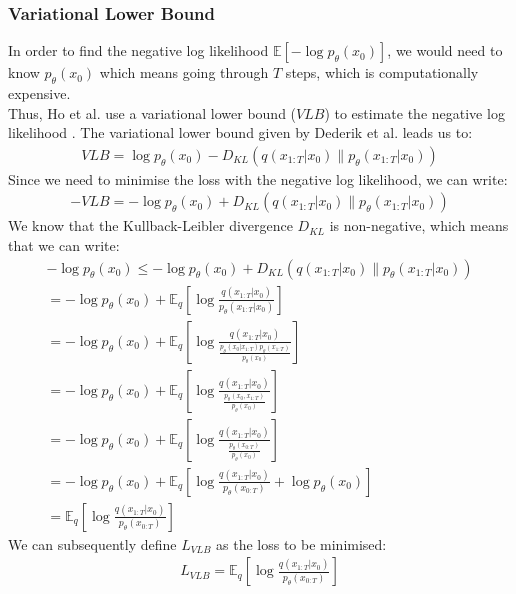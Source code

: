 \documentclass{article}
\begin{document}
\subsubsection{Variational Lower Bound}
In order to find the negative log likelihood $\mathbb{E}[- \log p_{\theta} (x_0)]$, we would need to know $p_{\theta} (x_0)$ which means going through $T$ steps, which is computationally expensive. \\
Thus, Ho et al. \cite{ho2020denoising} use a variational lower bound ($VLB$) to estimate the negative log likelihood \cite{ho2020denoising,sohldickstein2015deep}.
The variational lower bound given by Dederik et al. \cite{kingma2022autoencoding} leads us to:
\begin{gather}
  VLB = \log p_{\theta}(x_0) - D_{KL}(q(x_{1:T}|x_0) \| p_{\theta}(x_{1:T}|x_0)) \label{eq:7}
\end{gather}
Since we need to minimise the loss with the negative log likelihood, we can write:
\begin{gather}
  - VLB = - \log p_{\theta}(x_0) + D_{KL}(q(x_{1:T}|x_0) \| p_{\theta}(x_{1:T}|x_0)) \label{eq:8}
\end{gather}
We know that the Kullback-Leibler divergence $D_{KL}$ is non-negative, which means that we can write:
\begin{gather}
  - \log p_{\theta}(x_0) \leq - \log p_{\theta}(x_0) + D_{KL}(q(x_{1:T}|x_0) \| p_{\theta}(x_{1:T}|x_0)) \label{eq:9} \\
  = - \log p_{\theta}(x_0) + \mathbb{E}_q [\log \frac{q(x_{1:T}|x_0)}{p_{\theta}(x_{1:T}|x_0)}] \label{eq:10} \\
  = - \log p_{\theta}(x_0) + \mathbb{E}_q [\log \frac{q(x_{1:T}|x_0)}{\frac{p_{\theta}(x_0 | x_{1:T}) p_{\theta}(x_{1:T})}{p_{\theta}(x_0)}}] \label{eq:11} \\
  = - \log p_{\theta}(x_0) + \mathbb{E}_q [\log \frac{q(x_{1:T}|x_0)}{\frac{p_{\theta}(x_0, x_{1:T})}{p_{\theta}(x_0)}}] \label{eq:12} \\
  = - \log p_{\theta}(x_0) + \mathbb{E}_q [\log \frac{q(x_{1:T}|x_0)}{\frac{p_{\theta}(x_{0:T})}{p_{\theta}(x_0)}}] \label{eq:13} \\
  = - \log p_{\theta}(x_0) + \mathbb{E}_q [\log \frac{q(x_{1:T}|x_0)}{p_{\theta}(x_{0:T})} + \log {p_{\theta}(x_0)}] \label{eq:14} \\
  = \mathbb{E}_q [\log \frac{q(x_{1:T}|x_0)}{p_{\theta}(x_{0:T})}] \label{eq:15}
\end{gather}
We can subsequently define $L_{VLB}$ as the loss to be minimised:
\begin{gather}
  L_{VLB} = \mathbb{E}_q [\log \frac{q(x_{1:T}|x_0)}{p_{\theta}(x_{0:T})}] \label{eq:16}
\end{gather}
\end{document}
